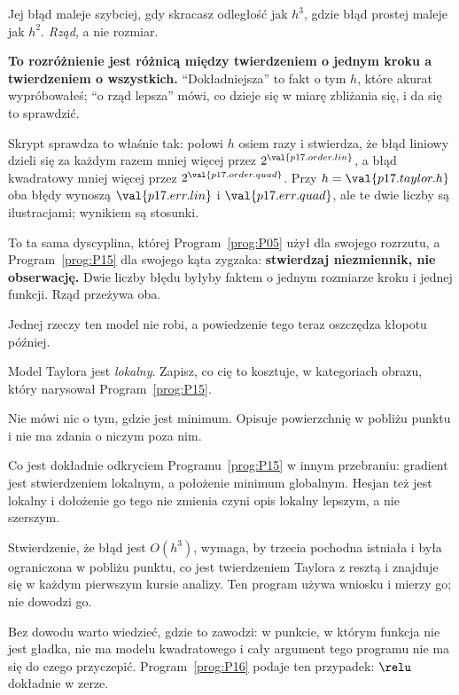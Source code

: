 \begin{fr}
\begin{ansblock}
Jej błąd maleje szybciej, gdy skracasz odległość \dash{} jak $h^{3}$, gdzie
błąd prostej maleje jak $h^{2}$. \emph{Rząd}, a nie rozmiar.
\end{ansblock}

\textbf{To rozróżnienie jest różnicą między twierdzeniem o jednym kroku a
twierdzeniem o wszystkich.} \enquote{Dokładniejsza} to fakt o tym $h$, które
akurat wypróbowałeś; \enquote{o rząd lepsza} mówi, co dzieje się w miarę
zbliżania się, i da się to sprawdzić.

Skrypt sprawdza to właśnie tak: połowi $h$ osiem razy i stwierdza, że błąd
liniowy dzieli się za każdym razem mniej więcej przez
$2^{\val{p17.order.lin}}$, a błąd kwadratowy mniej więcej przez
$2^{\val{p17.order.quad}}$. Przy $h = \val{p17.taylor.h}$ oba błędy wynoszą
$\val{p17.err.lin}$ i $\val{p17.err.quad}$, ale te dwie liczby są
ilustracjami; wynikiem są stosunki.

\begin{note}
To ta sama dyscyplina, której Program~\ref{prog:P05} użył dla swojego
rozrzutu, a Program~\ref{prog:P15} dla swojego kąta zygzaka:
\textbf{stwierdzaj niezmiennik, nie obserwację.} Dwie liczby błędu byłyby
faktem o jednym rozmiarze kroku i jednej funkcji. Rząd przeżywa oba.
\end{note}
\end{fr}

\begin{fr}
Jednej rzeczy ten model nie robi, a powiedzenie tego teraz oszczędza kłopotu
później.

Model Taylora jest \emph{lokalny}. Zapisz, co cię to kosztuje, w kategoriach
obrazu, który narysował Program~\ref{prog:P15}.
\dotline
\nextframe
\end{fr}

\begin{fr}
\begin{ansblock}
Nie mówi nic o tym, gdzie jest minimum. Opisuje powierzchnię w pobliżu punktu
i nie ma zdania o niczym poza nim.
\end{ansblock}

Co jest dokładnie odkryciem Programu~\ref{prog:P15} w innym przebraniu:
gradient jest stwierdzeniem lokalnym, a położenie minimum globalnym. Hesjan
też jest lokalny i dołożenie go tego nie zmienia \dash{} czyni opis lokalny
lepszym, a nie szerszym.

\begin{rigourbox}
Stwierdzenie, że błąd jest $O(h^{3})$, wymaga, by trzecia pochodna istniała i
była ograniczona w pobliżu punktu, co jest twierdzeniem Taylora z resztą i
znajduje się w każdym pierwszym kursie analizy. Ten program używa wniosku i
mierzy go; nie dowodzi go.

Bez dowodu warto wiedzieć, gdzie to zawodzi: w punkcie, w którym funkcja nie
jest gładka, nie ma modelu kwadratowego i cały argument tego programu nie ma
się do czego przyczepić. Program~\ref{prog:P16} podaje ten przypadek: $\relu$ dokładnie w zerze.
\end{rigourbox}
\end{fr}

